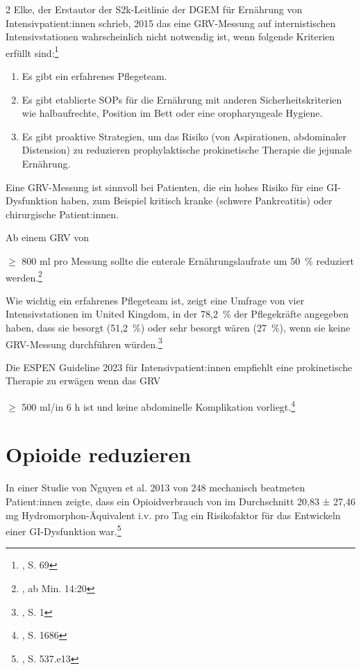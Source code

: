 \documentclass{article}
\begin{document}
\begin{multicols}{2}
  Elke, der Erstautor der S2k-Leitlinie der DGEM für Ernährung von Intensivpatient:innen schrieb, 2015 das eine GRV-Messung auf internistischen Intensivstationen wahrscheinlich nicht notwendig ist, wenn folgende Kriterien erfüllt sind:\footnote{\cite{elke2015GastricResidualVolume}, S. 69}
  \begin{enumerate}
    \item Es gibt ein erfahrenes Pflegeteam. 
    \item Es gibt etablierte SOPs für die Ernährung mit anderen Sicherheitskriterien wie halbaufrechte, Position im Bett oder eine oropharyngeale Hygiene. 
    \item Es gibt proaktive Strategien, um das Risiko (von Aspirationen, abdominaler Distension) zu reduzieren prophylaktische prokinetische Therapie die jejunale Ernährung. 
  \end{enumerate}

  Eine GRV-Messung ist sinnvoll bei Patienten, die ein hohes Risiko für eine GI-Dysfunktion haben, zum Beispiel kritisch kranke (schwere Pankreatitis) oder chirurgische Patient:innen. 

  Ab einem GRV von $\geq$ 800 ml pro Messung sollte die enterale Ernährungslaufrate um 50~\% reduziert werden.\footnote{\cite{tarcukovic2022MyEvidencebasedNutrition}, ab Min. 14:20}

  Wie wichtig ein erfahrenes Pflegeteam ist, zeigt eine Umfrage von vier Intensivstationen im United Kingdom, in der 78,2~\% der Pflegekräfte angegeben haben, dass sie besorgt (51,2~\%) oder sehr besorgt wären (27~\%), wenn sie keine GRV-Messung durchführen würden.\footnote{\cite{tume2024NursesDecisionmakingGastric}, S. 1}

  Die ESPEN Guideline 2023 für Intensivpatient:innen empfiehlt eine prokinetische Therapie zu erwägen wenn das GRV $\geq$ 500 ml/in 6 h ist und keine abdominelle Komplikation vorliegt.\footnote{\cite{singer2023ESPENPracticalPartially}, S. 1686} 

  \section{Opioide reduzieren}%
  \label{sec:Opioide reduzieren}

  In einer Studie von Nguyen et al. 2013 von 248 mechanisch beatmeten Patient:innen zeigte, dass ein Opioidverbrauch von im Durchschnitt 20,83 ± 27,46 mg Hydromorphon-Äquivalent i.v. pro Tag ein Risikofaktor für das Entwickeln einer GI-Dysfunktion war.\footnote{\cite{nguyen2013ImpairedGastrointestinalTransit}, S. 537.e13}


\end{multicols}
\end{document}
